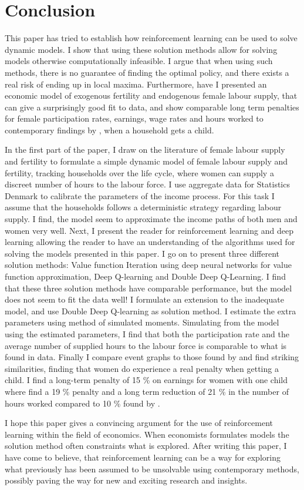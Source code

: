 \section{Conclusion}

This paper has tried to establish how reinforcement learning can be used to solve dynamic models. I show that using these solution methods allow for solving models otherwise computationally infeasible. I argue that when using such methods, there is no guarantee of finding the optimal policy, and there exists a real risk of ending up in local maxima. Furthermore, have I presented an economic model of exogenous fertility and endogenous female labour supply, that can give a surprisingly good fit to data, and show comparable long term penalties for female participation rates, earnings, wage rates and hours worked to contemporary findings by \textcite{kleven_children_2019}, when a household gets a child. 

In the first part of the paper, I draw on the literature of female labour supply and fertility to formulate a simple dynamic model of female labour supply and fertility, tracking households over the life cycle, where women can supply a discreet number of hours to the labour force. I use aggregate data for Statistics Denmark to calibrate the parameters of the income process. For this task I assume that the households follows a deterministic strategy regarding labour supply. I find, the model seem to approximate the income paths of both men and women very well. Next, I present the reader for reinforcement learning and deep learning allowing the reader to have an understanding of the algorithms used for solving the models presented in this paper.  I go on to present three different solution methods: Value function Iteration using deep neural networks for value function approximation, Deep Q-learning and Double Deep Q-Learning. I find that these three solution methods have comparable performance, but the model does not seem to fit the data well! I formulate an extension to the inadequate model, and use Double Deep Q-learning as solution method. I estimate the extra parameters using method of simulated moments. Simulating from the model using the estimated parameters, I find that both the participation rate and the average number of supplied hours to the labour force is comparable to what is found in data. Finally I compare event graphs to those found by \textcite{kleven_children_2019} and find striking similarities, finding that women do experience a real penalty when getting a child. I find a long-term penalty of 15 \% on earnings for women with one child where \textcite{kleven_children_2019} find a 19 \% penalty and a long term reduction of 21 \%  in the number of hours worked compared to 10 \% found by \textcite{kleven_children_2019}.  

I hope this paper gives a convincing argument for the use of reinforcement learning within the field of economics. When economists formulates models the solution method often constraints what is explored. After writing this paper, I have come to believe, that reinforcement learning can be a way for exploring what previously has been assumed to be unsolvable using contemporary methods, possibly paving the way for new and exciting research and insights.